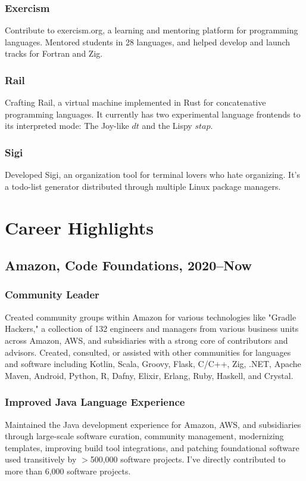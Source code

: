 \documentclass[9pt]{extarticle}
\begin{document}
\subsubsection{Exercism}
Contribute to exercism.org, a learning and mentoring platform for programming
languages. Mentored students in 28 languages, and helped develop and launch
tracks for Fortran and Zig.

\subsubsection{Rail}
Crafting Rail, a virtual machine implemented in Rust for concatenative
programming languages. It currently has two experimental language frontends to
its interpreted mode: The Joy-like $dt$ and the Lispy $stap$.

\subsubsection{Sigi}
Developed Sigi, an organization tool for terminal lovers who hate organizing.
It's a todo-list generator distributed through multiple Linux package managers.


\section{Career Highlights}

\subsection{Amazon, Code Foundations, 2020--Now}

\subsubsection{Community Leader}
Created community groups within Amazon for various technologies like "Gradle
Hackers," a collection of 132 engineers and managers from various business
units across Amazon, AWS, and subsidiaries with a strong core of contributors
and advisors. Created, consulted, or assisted with other communities for
languages and software including Kotlin, Scala, Groovy, Flask, C/C++, Zig,
.NET, Apache Maven, Android, Python, R, Dafny, Elixir, Erlang, Ruby, Haskell,
and Crystal.

\subsubsection{Improved Java Language Experience}
Maintained the Java development experience for Amazon, AWS, and subsidiaries
through large-scale software curation, community management, modernizing
templates, improving build tool integrations, and patching foundational software
used transitively by $>$500,000 software projects. I've directly contributed to
more than 6,000 software projects.
\end{document}
